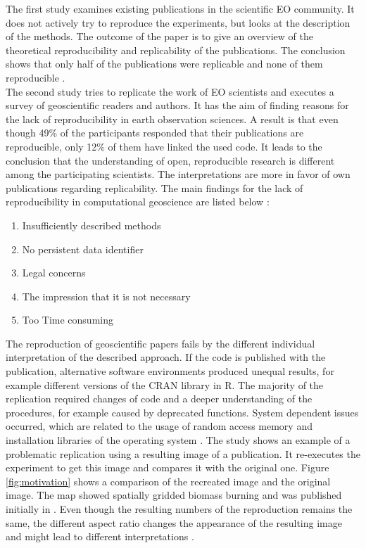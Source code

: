 \documentclass[draft,final]{vutinfth} %
\begin{document}
The first study examines existing publications in the scientific EO community. It does not actively try to reproduce the experiments, but looks at the description of the methods. The outcome of the paper is to give an overview of the theoretical reproducibility and replicability of the publications. The conclusion shows that only half of the publications were replicable and none of them reproducible \cite{Ostermann2017AdvancingSW}. \\
The second study tries to replicate the work of EO scientists and executes a survey of geoscientific readers and authors. It has the aim of finding reasons for the lack of reproducibility in earth observation sciences. A result is that even though 49\% of the participants responded that their publications are reproducible, only 12\% of them have linked the used code. It leads to the conclusion that the understanding of open, reproducible research is different among the participating scientists. The interpretations are more in favor of own publications regarding replicability. The main findings for the lack of reproducibility in computational geoscience are listed below \cite{Thestateofreproducibility}:  

\begin{enumerate}
	\item Insufficiently described methods 
	\item No persistent data identifier
	\item Legal concerns
	\item The impression that it is not necessary
	\item Too Time consuming
\end{enumerate} 

The reproduction of geoscientific papers fails by the different individual interpretation of the described approach. If the code is published with the publication, alternative software environments produced unequal results, for example different versions of the CRAN library in R. The majority of the replication required changes of code and a deeper understanding of the procedures, for example caused by deprecated functions. System dependent issues occurred, which are related to the usage of random access memory and installation libraries of the operating system . 
The study shows an example of a problematic replication using a resulting image of a publication.
It re-executes the experiment to get this image and compares it with the original one. Figure \ref{fig:motivation} shows a comparison of the recreated image and the original image. The map showed spatially gridded biomass burning and was published initially in \cite{bg-13-3225-2016}. Even though the resulting numbers of the reproduction remains the same, the different aspect ratio changes the appearance of the resulting image and might lead to different interpretations \cite{Thestateofreproducibility}.
\end{document}
